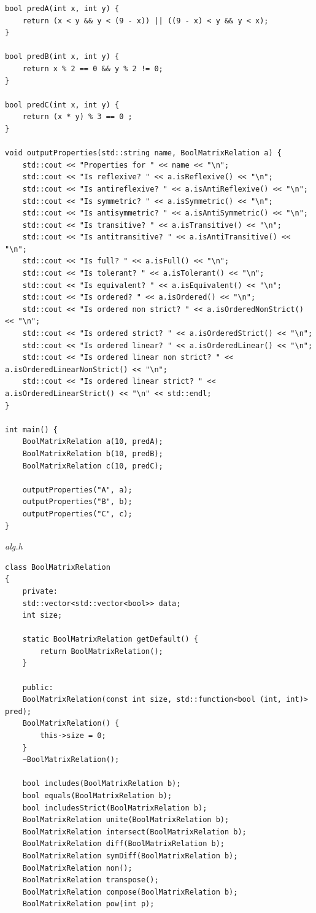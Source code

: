 \documentclass[a4paper,14pt]{extarticle}
\begin{document}
\begin{enumerate}[label=2.\arabic*.]
\begin{verbatim}
bool predA(int x, int y) {
	return (x < y && y < (9 - x)) || ((9 - x) < y && y < x);
}

bool predB(int x, int y) {
	return x % 2 == 0 && y % 2 != 0;
}

bool predC(int x, int y) {
	return (x * y) % 3 == 0 ;
}

void outputProperties(std::string name, BoolMatrixRelation a) {
	std::cout << "Properties for " << name << "\n";
	std::cout << "Is reflexive? " << a.isReflexive() << "\n";
	std::cout << "Is antireflexive? " << a.isAntiReflexive() << "\n";
	std::cout << "Is symmetric? " << a.isSymmetric() << "\n";
	std::cout << "Is antisymmetric? " << a.isAntiSymmetric() << "\n";
	std::cout << "Is transitive? " << a.isTransitive() << "\n";
	std::cout << "Is antitransitive? " << a.isAntiTransitive() << "\n";
	std::cout << "Is full? " << a.isFull() << "\n";
	std::cout << "Is tolerant? " << a.isTolerant() << "\n";
	std::cout << "Is equivalent? " << a.isEquivalent() << "\n";
	std::cout << "Is ordered? " << a.isOrdered() << "\n";
	std::cout << "Is ordered non strict? " << a.isOrderedNonStrict() << "\n";
	std::cout << "Is ordered strict? " << a.isOrderedStrict() << "\n";
	std::cout << "Is ordered linear? " << a.isOrderedLinear() << "\n";
	std::cout << "Is ordered linear non strict? " << a.isOrderedLinearNonStrict() << "\n";
	std::cout << "Is ordered linear strict? " << a.isOrderedLinearStrict() << "\n" << std::endl;
}

int main() {
	BoolMatrixRelation a(10, predA);
	BoolMatrixRelation b(10, predB);
	BoolMatrixRelation c(10, predC);
	
	outputProperties("A", a);
	outputProperties("B", b);
	outputProperties("C", c);
}
    	\end{verbatim}
    	\textit{alg.h}
    	\begin{verbatim}
class BoolMatrixRelation
{
	private:
	std::vector<std::vector<bool>> data;
	int size;
	
	static BoolMatrixRelation getDefault() {
		return BoolMatrixRelation();
	}
	
	public:
	BoolMatrixRelation(const int size, std::function<bool (int, int)> pred);
	BoolMatrixRelation() {
		this->size = 0;
	}
	~BoolMatrixRelation();
	
	bool includes(BoolMatrixRelation b);
	bool equals(BoolMatrixRelation b);
	bool includesStrict(BoolMatrixRelation b);
	BoolMatrixRelation unite(BoolMatrixRelation b);
	BoolMatrixRelation intersect(BoolMatrixRelation b);
	BoolMatrixRelation diff(BoolMatrixRelation b);
	BoolMatrixRelation symDiff(BoolMatrixRelation b);
	BoolMatrixRelation non();
	BoolMatrixRelation transpose();
	BoolMatrixRelation compose(BoolMatrixRelation b);
	BoolMatrixRelation pow(int p);
	

\end{verbatim}
\end{enumerate}
\end{document}
